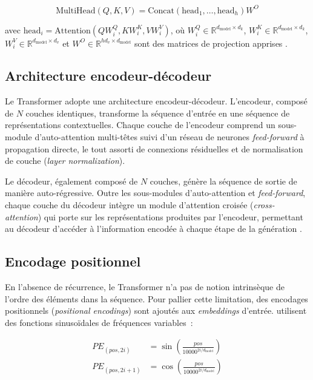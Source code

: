 \documentclass[12pt,a4paper,oneside]{report}
\begin{document}
\begin{equation}
\text{MultiHead}(Q, K, V) = \text{Concat}(\text{head}_1, \ldots, \text{head}_h)W^O
\label{eq:multihead}
\end{equation}

\noindent avec $\text{head}_i = \text{Attention}(QW_i^Q, KW_i^K, VW_i^V)$, où $W_i^Q \in \mathbb{R}^{d_{\text{model}} \times d_k}$, $W_i^K \in \mathbb{R}^{d_{\text{model}} \times d_k}$, $W_i^V \in \mathbb{R}^{d_{\text{model}} \times d_v}$ et $W^O \in \mathbb{R}^{hd_v \times d_{\text{model}}}$ sont des matrices de projection apprises \citep{vaswani2017}.

\subsection{Architecture encodeur-décodeur}

Le Transformer adopte une architecture encodeur-décodeur. L'encodeur, composé de $N$ couches identiques, transforme la séquence d'entrée en une séquence de représentations contextuelles. Chaque couche de l'encodeur comprend un sous-module d'auto-attention multi-têtes suivi d'un réseau de neurones \textit{feed-forward} à propagation directe, le tout assorti de connexions résiduelles et de normalisation de couche (\textit{layer normalization}).

Le décodeur, également composé de $N$ couches, génère la séquence de sortie de manière auto-régressive. Outre les sous-modules d'auto-attention et \textit{feed-forward}, chaque couche du décodeur intègre un module d'attention croisée (\textit{cross-attention}) qui porte sur les représentations produites par l'encodeur, permettant au décodeur d'accéder à l'information encodée à chaque étape de la génération \citep{vaswani2017}.

\subsection{Encodage positionnel}

En l'absence de récurrence, le Transformer n'a pas de notion intrinsèque de l'ordre des éléments dans la séquence. Pour pallier cette limitation, des encodages positionnels (\textit{positional encodings}) sont ajoutés aux \textit{embeddings} d'entrée. \citet{vaswani2017} utilisent des fonctions sinusoïdales de fréquences variables~:

\begin{align}
PE_{(pos, 2i)}   &= \sin\left(\frac{pos}{10000^{2i/d_{\text{model}}}}\right) \\
PE_{(pos, 2i+1)} &= \cos\left(\frac{pos}{10000^{2i/d_{\text{model}}}}\right)
\end{align}
\end{document}
